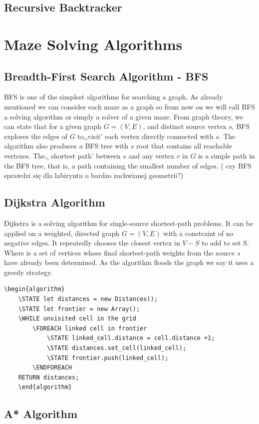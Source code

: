 \subsection{Recursive Backtracker}
\section{Maze Solving Algorithms}
\subsection{Breadth-First Search Algorithm - BFS}
BFS is one of the simplest algorithms for searching a graph. As already mentioned we can consider each maze as a graph so from now on we will call 
BFS a solving algorithm or simply a solver of a given maze. From graph theory, we can state that for a given graph $ G = ( V, E) $, and distinct source 
vertex $s$, BFS explores the edges of $G$ to,,visit' each vertex directly connected with $s$. The algorithm also produces a BFS tree with $s$ root that 
contains all reachable vertexes. The,, shortest path' between $s$ and any vertex $v$ in $G$ is a simple path in the BFS tree, that is, a path containing
the smallest number of edges. \cite{3} ( czy BFS sprawdzi się dla labiryntu o bardzo zachwianej geometrii?)
\subsection{Dijkstra Algorithm}
Dijkstra is a solving algorithm for single-source shortest-path problems. It can be applied on a weighted, directed graph $G=(V, E)$ with a constraint of no negative edges. 
It repeatedly chooses the closest vertex in $V-S$ to add to set S. 
Where  is a set of vertices whose final shortest-path weights from the source \textit{s} have already been determined.
As the algorithm floods the graph we say it uses a greedy strategy.
\begin{lstlisting}[caption={Pseudocode for a Dijkstra's algorithm}]
	\begin{algorithm}
	\STATE let distances = new Distances();
	\STATE let frontier = new Array();
	\WHILE unvisited cell in the grid
		\FOREACH linked cell in frontier
			\STATE linked_cell.distance = cell.distance +1;
			\STATE distances.set_cell(linked_cell);
			\STATE frontier.push(linked_cell);
	    \ENDFOREACH
	RETURN distances;
	\end{algorithm}
	\end{lstlisting}
\subsection{A* Algorithm}

\begin{lstlisting}

\end{lstlisting}




